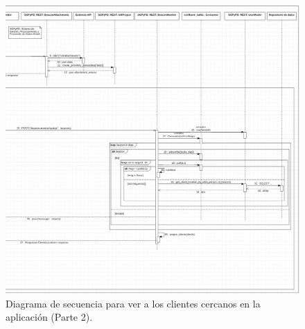 \FloatBarrier
\begin{figure}[htbp!]
		\centering
			\includegraphics[width=1 \textwidth]{imagenes/adrian/vendedor/prototipo2/clientes_cercanos_2}
		\caption{Diagrama de secuencia para ver a los clientes cercanos en la aplicación (Parte 2).}
		\label{secuencia-AIPV2-cercanosDos}
\end{figure}
\FloatBarrier






